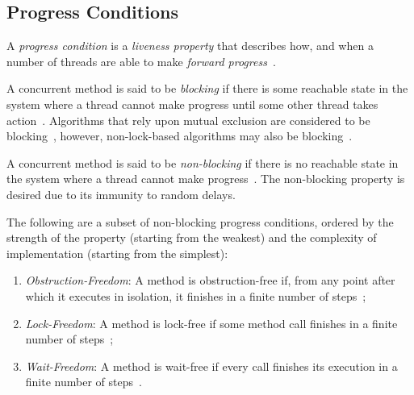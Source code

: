 
\subsection{Progress Conditions}
A \emph{progress condition} is a \emph{liveness property} that describes how,
and when a number of threads are able to make \emph{forward
progress}~\citep[Section~3.2]{scott2013shared}.

A concurrent method is said to be \emph{blocking} if there is some reachable
state in the system where a thread cannot make progress until some other thread
takes action~\citep[Section~3.2]{scott2013shared}. Algorithms that rely upon
mutual exclusion are considered to be
blocking~\citep[Section~3.2]{scott2013shared}, however, non-lock-based
algorithms may also be blocking~\citep{mellor1987concurrent}.

A concurrent method is said to be \emph{non-blocking} if there is no reachable
state in the system where a thread cannot make
progress~\cite[Section~3.2]{scott2013shared}. The non-blocking property is
desired due to its immunity to random delays. %

The following are a subset of non-blocking progress conditions, ordered by the
strength of the property (starting from the weakest) and the complexity of
implementation (starting from the simplest):

\begin{enumerate}
\item \emph{Obstruction-Freedom}: A method is obstruction-free if, from any
point after which it executes in isolation, it finishes in a finite number of
steps~\citep[Section~3.8.3]{herlihy2020art};
\item \emph{Lock-Freedom}: A method is lock-free if some method call finishes
in a finite number of steps~\citep[Section~3.8.2]{herlihy2020art};
\item \emph{Wait-Freedom}: A method is wait-free if every call finishes its
execution in a finite number of steps~\citep[Section~3.8.1]{herlihy2020art}.
\end{enumerate}

